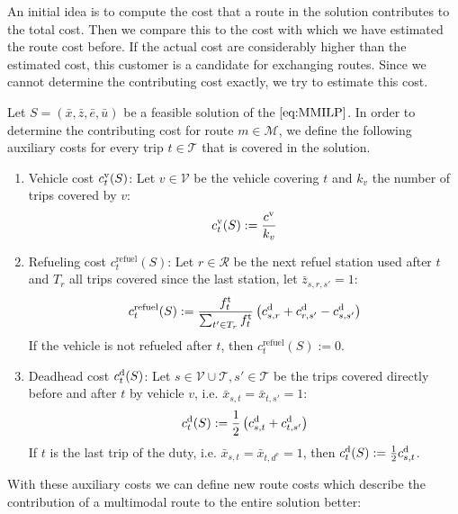 An initial idea is to compute the cost that a route in the solution contributes to the total cost. Then we compare this to the cost with which we have estimated the route cost before. If the actual cost are considerably higher than the estimated cost, this customer is a candidate for exchanging routes. Since we cannot determine the contributing cost exactly, we try to estimate this cost.

Let $S=\left(\bar{x},\bar{z},\bar{e},\bar{u}\right)$ be a feasible solution of the $\eqref{eq:MMILP}$. In order to determine the contributing cost for route $m\in\mathcal{M}$, we define the following auxiliary costs for every trip $t\in\mathcal{T}$ that is covered in the solution.
\begin{enumerate}
	\item{Vehicle cost $c^{\operatorname{v}}_t(S)$:}
Let $v\in\mathcal{V}$ be the vehicle covering $t$ and $k_v$ the number of trips covered by $v$:
\begin{align*}
	c^{\operatorname{v}}_t(S) := \frac{c^{\operatorname{v}}}{k_v}
\end{align*}
	\item{Refueling cost $c^{\operatorname{refuel}}_t(S)$:}
Let $r\in\mathcal{R}$ be the next refuel station used after $t$ and $T_r$ all trips covered since the last station, let $\bar{z}_{s,r,s'} = 1$:
\begin{align*}
	c^{\operatorname{refuel}}_t(S) := \frac{f^{\operatorname{t}}_t}{\sum_{t'\in T_r} f^{\operatorname{t}}_t}\left(c^{\operatorname{d}}_{s,r}+c^{\operatorname{d}}_{r,s'}-c^{\operatorname{d}}_{s,s'}\right)
\end{align*}
If the vehicle is not refueled after $t$, then $c^{\operatorname{refuel}}_t(S) := 0$.
	\item{Deadhead cost $c^{\operatorname{d}}_t(S)$:}
Let $s\in\mathcal{V}\cup\mathcal{T},s'\in\mathcal{T}$ be the trips covered directly before and after $t$ by vehicle $v$, i.e. $\bar{x}_{s,t}=\bar{x}_{t,s'}=1$:
\begin{align*}
	c^{\operatorname{d}}_t(S) := \frac 1 2 \left(c^{\operatorname{d}}_{s,t}+c^{\operatorname{d}}_{t,s'}\right)
\end{align*}
If $t$ is the last trip of the duty, i.e. $\bar{x}_{s,t}=\bar{x}_{t,d^{\operatorname{e}}}=1$, then $c^{\operatorname{d}}_t(S) := \frac 1 2 c^{\operatorname{d}}_{s,t}$.
\end{enumerate}

With these auxiliary costs we can define new route costs which describe the contribution of a multimodal route to the entire solution better:


